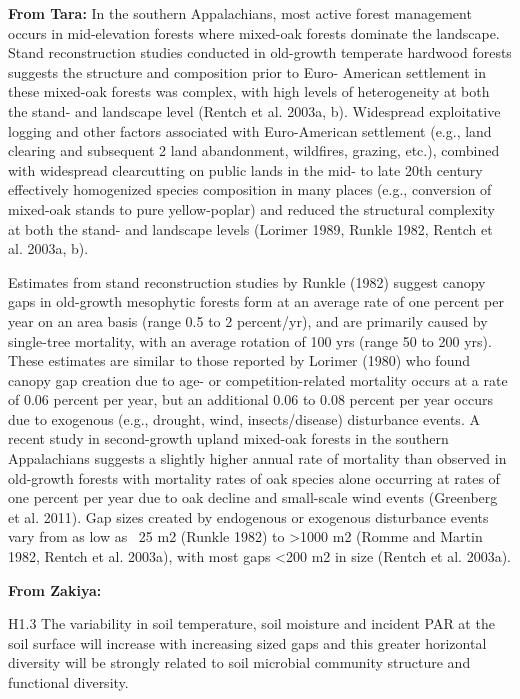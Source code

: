 \documentclass{article}\usepackage[]{graphicx}\usepackage[]{color}
\begin{document}
\textbf{\large{From Tara:}}
In the southern Appalachians, most active forest management occurs in mid-elevation forests where mixed-oak forests dominate the landscape. Stand reconstruction studies conducted in old-growth temperate hardwood forests suggests the structure and composition prior to Euro- American settlement in these mixed-oak forests was complex, with high levels of heterogeneity at both the stand- and landscape level (Rentch et al. 2003a, b). Widespread exploitative logging and other factors associated with Euro-American settlement (e.g., land clearing and subsequent
2
land abandonment, wildfires, grazing, etc.), combined with widespread clearcutting on public lands in the mid- to late 20th century effectively homogenized species composition in many places (e.g., conversion of mixed-oak stands to pure yellow-poplar) and reduced the structural complexity at both the stand- and landscape levels (Lorimer 1989, Runkle 1982, Rentch et al. 2003a, b).

Estimates from stand reconstruction studies by Runkle (1982) suggest canopy gaps in old-growth mesophytic forests form at an average rate of one percent per year on an area basis (range 0.5 to 2 percent/yr), and are primarily caused by single-tree mortality, with an average rotation of 100 yrs (range 50 to 200 yrs). These estimates are similar to those reported by Lorimer (1980) who found canopy gap creation due to age- or competition-related mortality occurs at a rate of 0.06 percent per year, but an additional 0.06 to 0.08 percent per year occurs due to exogenous (e.g., drought, wind, insects/disease) disturbance events. A recent study in second-growth upland mixed-oak forests in the southern Appalachians suggests a slightly higher annual rate of mortality than observed in old-growth forests with mortality rates of oak species alone occurring at rates of one percent per year due to oak decline and small-scale wind events (Greenberg et al. 2011). Gap sizes created by endogenous or exogenous disturbance events vary from as low as ~25 m2 (Runkle 1982) to >1000 m2 (Romme and Martin 1982, Rentch et al. 2003a), with most gaps <200 m2 in size (Rentch et al. 2003a).


\textbf{\large{From Zakiya:}}

H1.3 The variability in soil temperature, soil moisture and incident PAR at the soil surface will increase with increasing sized gaps and this greater horizontal diversity will be strongly related to soil microbial community structure and functional diversity.
\end{document}

